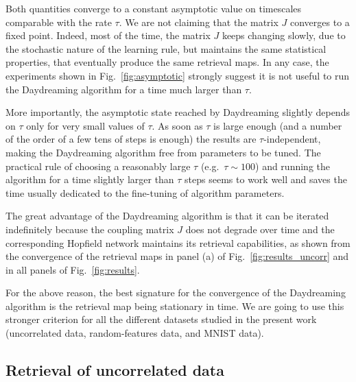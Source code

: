 \documentclass[a4paper]{cas-sc}
\begin{document}
Both quantities converge to a constant asymptotic value on timescales comparable with the rate $\tau$. We are not claiming that the matrix $J$ converges to a fixed point. Indeed, most of the time, the matrix $J$ keeps changing slowly, due to the stochastic nature of the learning rule, but maintains the same statistical properties, that eventually produce the same retrieval maps. In any case, the experiments shown in Fig.~\ref{fig:asymptotic} strongly suggest it is not useful to run the Daydreaming algorithm for a time much larger than $\tau$.

More importantly, the asymptotic state reached by Daydreaming slightly depends on $\tau$ only for very small values of $\tau$. As soon as $\tau$ is large enough (and a number of the order of a few tens of steps is enough) the results are $\tau$-independent, making the Daydreaming algorithm free from parameters to be tuned. The practical rule of choosing a reasonably large $\tau$ (e.g.\ $\tau \sim 100$) and running the algorithm for a time slightly larger than $\tau$ steps seems to work well and saves the time usually dedicated to the fine-tuning of algorithm parameters.

The great advantage of the Daydreaming algorithm is that it can be iterated indefinitely because the coupling matrix $J$ does not degrade over time and the corresponding Hopfield network maintains its retrieval capabilities, as shown from the convergence of the retrieval maps in panel (a) of Fig.~\ref{fig:results_uncorr} and in all panels of Fig.~\ref{fig:results}. 

For the above reason, the best signature for the convergence of the Daydreaming algorithm is the retrieval map being stationary in time. We are going to use this stronger criterion for all the different datasets studied in the present work (uncorrelated data, random-features data, and MNIST data).

\subsection{Retrieval of uncorrelated data} 
\end{document}
